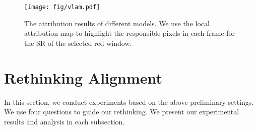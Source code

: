 \documentclass{article}
\begin{document}
\begin{figure}[t]
    \centering
    \texttt{[image: fig/vlam.pdf]}
    \vspace{-5mm}
    \caption{The attribution results of different models. We use the local attribution map \cite{gu2021interpreting} to highlight the responsible pixels in each frame for the SR of the selected red window.}
    \label{fig:vlam}
    \vspace{-6mm}
\end{figure}


\begin{table}[t]
    \footnotesize
    \centering
    \caption{Comparison of VSR Transformers with different alignment methods on the REDS4 dataset.}
    \label{tab:3-10sliding}
    \vspace{1mm}
    \vspace{-6mm}
\end{table}

\vspace{-3mm}
\section{Rethinking Alignment}
\label{sec:analysis}
\vspace{-2mm}
In this section, we conduct experiments based on the above preliminary settings. We use four questions to guide our rethinking. We present our experimental results and analysis in each subsection.
\end{document}
